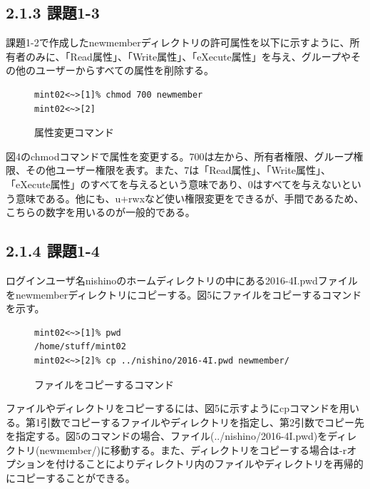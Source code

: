 \documentclass[12pt]{jreport}
\begin{document}
            \subsection*{2.1.3 課題1-3}
                課題1-2で作成したnewmemberディレクトリの許可属性を以下に示すように、所有者のみに、「Read属性」、「Write属性」、「eXecute属性」を与え、グループやその他のユーザーからすべての属性を削除する。
                \begin{figure}[H]
                    \begin{center}
                        \begin{screen}
                            \begin{verbatim}
mint02<~>[1]% chmod 700 newmember
mint02<~>[2]
                            \end{verbatim}
                        \end{screen}
                        \caption{属性変更コマンド}
                        \label{4}
                    \end{center}
                \end{figure}
                図4のchmodコマンドで属性を変更する。700は左から、所有者権限、グループ権限、その他ユーザー権限を表す。また、7は「Read属性」、「Write属性」、「eXecute属性」のすべてを与えるという意味であり、0はすべてを与えないという意味である。他にも、u+rwxなど使い権限変更をできるが、手間であるため、こちらの数字を用いるのが一般的である。

            \subsection*{2.1.4 課題1-4}
                ログインユーザ名nishinoのホームディレクトリの中にある2016-4I.pwdファイルをnewmemberディレクトリにコピーする。図5にファイルをコピーするコマンドを示す。

                \begin{figure}[H]
                    \begin{center}
                        \begin{screen}
                            \begin{verbatim}
mint02<~>[1]% pwd
/home/stuff/mint02
mint02<~>[2]% cp ../nishino/2016-4I.pwd newmember/
                            \end{verbatim}
                        \end{screen}
                        \caption{ファイルをコピーするコマンド}
                        \label{5}
                    \end{center}
                \end{figure}
                ファイルやディレクトリをコピーするには、図5に示すようにcpコマンドを用いる。第1引数でコピーするファイルやディレクトリを指定し、第2引数でコピー先を指定する。図5のコマンドの場合、ファイル(../nishino/2016-4I.pwd)をディレクトリ(newmember/)に移動する。また、ディレクトリをコピーする場合は-rオプションを付けることによりディレクトリ内のファイルやディレクトリを再帰的にコピーすることができる。
\end{document}
